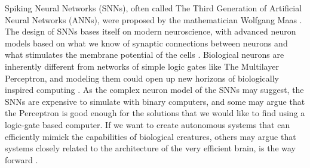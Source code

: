 Spiking Neural Networks (SNNs), often called The Third Generation of Artificial Neural Networks (ANNs), were proposed by the mathematician Wolfgang Maas \cite{maass_networks_1997}.
The design of SNNs bases itself on modern neuroscience,
with advanced neuron models based on what we know of synaptic connections between neurons and what stimulates the membrane potential of the cells \cite{ghosh-dastidar_improved_2007}.
Biological neurons are inherently different from networks of simple logic gates like The Multilayer Perceptron, and modeling them could open up new horizons of biologically inspired computing\cite{cowan_discussion_1990} \cite{aamir_accelerated_2018}.
As the complex neuron model of the SNNs may suggest, the SNNs are expensive to simulate with binary computers, and some may argue that the Perceptron is good enough for the solutions that we would like to find using a logic-gate based computer.
If we want to create autonomous systems that can efficiently mimick the capabilities of biological creatures, others may argue that systems closely related to the architecture of the very efficient brain, is the way forward \cite{lee_training_2016} \cite{cao_spiking_2015}.

